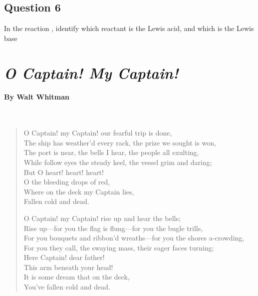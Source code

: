\documentclass[11pt, letterpaper]{memoir}
\begin{document}
{	\subsection*{Question 6}
	In the reaction , identify which reactant is the Lewis acid, and which is the Lewis base
	\newpage
	\pagestyle{empty}
	\addtocounter{page}{-1}
	\section*{\emph{O Captain! My Captain!}}
	\paragraph{By Walt Whitman}~
	\begin{verse}
		O Captain! my Captain! our fearful trip is done,\\
		The ship has weather’d every rack, the prize we sought is won,\\
		The port is near, the bells I hear, the people all exulting,\\
		While follow eyes the steady keel, the vessel grim and daring;\\
		\hspace{7em} But O heart! heart! heart!\\
		\hspace{8em} O the bleeding drops of red,\\
		\hspace{9em} Where on the deck my Captain lies,\\
		\hspace{10em} Fallen cold and dead.
		
		O Captain! my Captain! rise up and hear the bells;\\
		Rise up—for you the flag is flung—for you the bugle trills,\\
		For you bouquets and ribbon’d wreaths—for you the shores a-crowding,\\
		For you they call, the swaying mass, their eager faces turning;\\
		\hspace{7em} Here Captain! dear father!\\
		\hspace{8em} This arm beneath your head!\\
		\hspace{9em} It is some dream that on the deck,\\
		\hspace{10em} You’ve fallen cold and dead.
		

\end{verse}}
\end{document}

